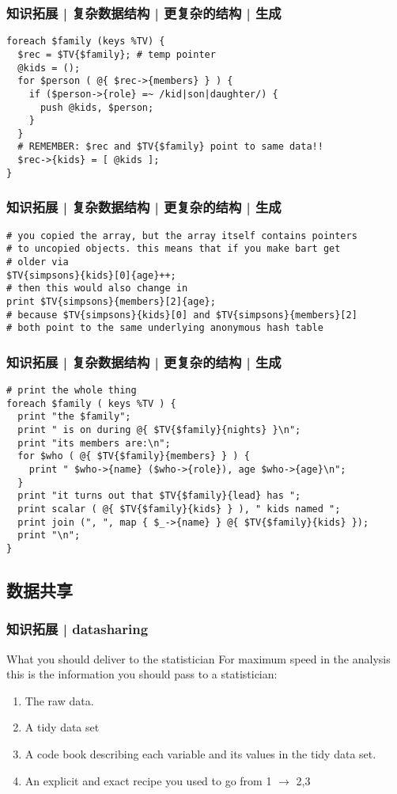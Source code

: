 \begin{frame}[fragile]
  \frametitle{知识拓展 | 复杂数据结构 | 更复杂的结构 | 生成}
\begin{lstlisting}
foreach $family (keys %TV) {
  $rec = $TV{$family}; # temp pointer
  @kids = ();
  for $person ( @{ $rec->{members} } ) {
    if ($person->{role} =~ /kid|son|daughter/) {
      push @kids, $person;
    }
  }
  # REMEMBER: $rec and $TV{$family} point to same data!!
  $rec->{kids} = [ @kids ];
}
\end{lstlisting}
\end{frame}

\begin{frame}[fragile]
  \frametitle{知识拓展 | 复杂数据结构 | 更复杂的结构 | 生成}
\begin{lstlisting}
# you copied the array, but the array itself contains pointers
# to uncopied objects. this means that if you make bart get
# older via
$TV{simpsons}{kids}[0]{age}++;
# then this would also change in
print $TV{simpsons}{members}[2]{age};
# because $TV{simpsons}{kids}[0] and $TV{simpsons}{members}[2]
# both point to the same underlying anonymous hash table
\end{lstlisting}
\end{frame}

\begin{frame}[fragile]
  \frametitle{知识拓展 | 复杂数据结构 | 更复杂的结构 | 生成}
  \vspace{-0.6em}
\begin{lstlisting}[basicstyle=\small\tt]
# print the whole thing
foreach $family ( keys %TV ) {
  print "the $family";
  print " is on during @{ $TV{$family}{nights} }\n";
  print "its members are:\n";
  for $who ( @{ $TV{$family}{members} } ) {
    print " $who->{name} ($who->{role}), age $who->{age}\n";
  }
  print "it turns out that $TV{$family}{lead} has ";
  print scalar ( @{ $TV{$family}{kids} } ), " kids named ";
  print join (", ", map { $_->{name} } @{ $TV{$family}{kids} });
  print "\n";
}
\end{lstlisting}
\end{frame}

\subsection{数据共享}
\begin{frame}
  \frametitle{知识拓展 | datasharing}
  \begin{block}{What you should deliver to the statistician}
    For maximum speed in the analysis this is the information you should pass to a statistician:
    \begin{enumerate}
      \item The raw data.
      \item A tidy data set
      \item A code book describing each variable and its values in the tidy data set.
      \item An explicit and exact recipe you used to go from 1 $\rightarrow$ 2,3
    \end{enumerate}
  \end{block}
\end{frame}

